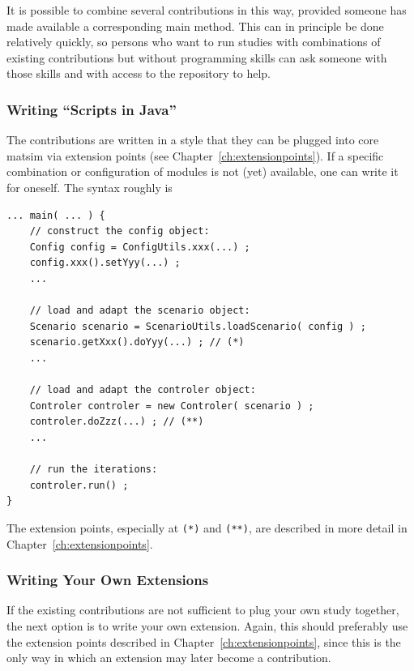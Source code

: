 It is possible to combine several \glspl{contribution} in this way, provided someone has made available a corresponding main method.  This can in principle be done relatively quickly, so persons who want to run studies with combinations of existing \glspl{contribution} but without programming skills can ask someone with those skills and with access to the repository to help.

\subsubsection{Writing \enquote{Scripts in Java}}
\label{sec:writing-scripts-java}
The \glspl{contribution} are written in a style that they can be plugged into core \gls{matsim} via extension points (see Chapter~\ref{ch:extensionpoints}). If a specific combination or configuration of modules is not (yet) available, one can write it for oneself. The syntax roughly is
\begin{lstlisting}
... main( ... ) {
    // construct the config object:
    Config config = ConfigUtils.xxx(...) ;
    config.xxx().setYyy(...) ;
    ...

    // load and adapt the scenario object:
    Scenario scenario = ScenarioUtils.loadScenario( config ) ;
    scenario.getXxx().doYyy(...) ; // (*)
    ...

    // load and adapt the controler object:
    Controler controler = new Controler( scenario ) ;
    controler.doZzz(...) ; // (**)
    ...

    // run the iterations:
    controler.run() ;
}
\end{lstlisting}
The extension points, especially at \lstinline{(*)} and \lstinline{(**)}, are described in more detail in Chapter~\ref{ch:extensionpoints}.

\subsubsection{Writing Your Own Extensions}
\label{sec:writing-your-own-extensions}
If the existing \glspl{contribution} are not sufficient to plug your own study together, the next option is to write your own \gls{extension}.  Again, this should preferably use the extension points described in Chapter~\ref{ch:extensionpoints}, since this is the only way in which an \gls{extension} may later become a \gls{contribution}.  

